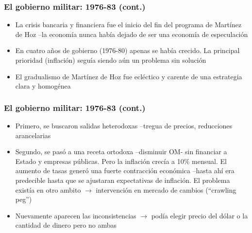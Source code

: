 \documentclass[14pt,aspectratio=169]{beamer}
\begin{document}
               \begin{frame}\frametitle{El gobierno militar: 1976-83 (cont.)}
                 \begin{itemize}\itemsep 5pt \medskip
                 \item La crisis bancaria y financiera fue el inicio
                   del fin del programa de Martínez de Hoz --la
                   economía nunca había dejado de ser una economía de
                   especulación
                   \item En cuatro años de gobierno (1976-80) apenas
                     se había crecido. La principal prioridad
                     (inflación) seguía siendo aún un problema sin
                     solución
                     \item El gradualismo de Martínez de Hoz fue
                       ecléctico y carente de una estrategia clara y homogénea
                   \end{itemize} 
               \end{frame}
               

\begin{frame}\frametitle{El gobierno militar: 1976-83 (cont.)}
                 \begin{itemize}\itemsep 5pt \medskip
                 \item Primero, se buscaron salidas heterodoxas
                   --tregua de precios, reducciones arancelarias
                   \item Segundo, se pasó a una receta ortodoxa
                     --disminuir OM- sin financiar a Estado y empresas
                     públicas. Pero la inflación crecía a 10\%
                     mensual. El aumento de tasas generó una fuerte
                     contracción económica --hasta ahí era predecible
                     hasta que se ajustaran expectativas de
                     inflación. El problema existía en otro ambito
                     $\longrightarrow$ intervención en mercado de
                     cambios (``crawling peg'')
                     \item Nuevamente aparecen las inconsistencias
                       $\longrightarrow$ podía elegir precio del dólar
                       o la cantidad de dinero pero no ambas
                   \end{itemize} 
               \end{frame}
               
\end{document}
